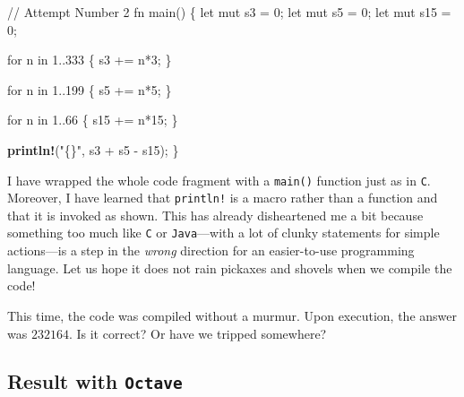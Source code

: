 \documentclass[
  a4paper,
]{article}
\newenvironment{Shaded}{\begin{snugshade}}{\end{snugshade}}
\newcommand{\CommentTok}[1]{\textcolor[rgb]{0.50,0.62,0.50}{#1}}
\newcommand{\ControlFlowTok}[1]{\textcolor[rgb]{0.94,0.87,0.69}{#1}}
\newcommand{\DecValTok}[1]{\textcolor[rgb]{0.86,0.86,0.80}{#1}}
\newcommand{\KeywordTok}[1]{\textcolor[rgb]{0.94,0.87,0.69}{#1}}
\newcommand{\NormalTok}[1]{\textcolor[rgb]{0.80,0.80,0.80}{#1}}
\newcommand{\OperatorTok}[1]{\textcolor[rgb]{0.94,0.94,0.82}{#1}}
\newcommand{\PreprocessorTok}[1]{\textcolor[rgb]{1.00,0.81,0.69}{\textbf{#1}}}
\newcommand{\StringTok}[1]{\textcolor[rgb]{0.80,0.58,0.58}{#1}}
\begin{document}
\begin{Shaded}
\begin{Highlighting}[]
 \CommentTok{// Attempt Number 2}
\KeywordTok{fn}\NormalTok{ main() }\OperatorTok{\{}
    \KeywordTok{let} \KeywordTok{mut}\NormalTok{ s3 }\OperatorTok{=} \DecValTok{0}\OperatorTok{;}
    \KeywordTok{let} \KeywordTok{mut}\NormalTok{ s5 }\OperatorTok{=} \DecValTok{0}\OperatorTok{;}
    \KeywordTok{let} \KeywordTok{mut}\NormalTok{ s15 }\OperatorTok{=} \DecValTok{0}\OperatorTok{;}

    \ControlFlowTok{for}\NormalTok{ n }\KeywordTok{in} \DecValTok{1}\OperatorTok{..}\DecValTok{333} \OperatorTok{\{}
\NormalTok{        s3 }\OperatorTok{+=}\NormalTok{ n}\OperatorTok{*}\DecValTok{3}\OperatorTok{;}
    \OperatorTok{\}}

    \ControlFlowTok{for}\NormalTok{ n }\KeywordTok{in} \DecValTok{1}\OperatorTok{..}\DecValTok{199} \OperatorTok{\{}
\NormalTok{        s5 }\OperatorTok{+=}\NormalTok{ n}\OperatorTok{*}\DecValTok{5}\OperatorTok{;}
    \OperatorTok{\}}

    \ControlFlowTok{for}\NormalTok{ n }\KeywordTok{in} \DecValTok{1}\OperatorTok{..}\DecValTok{66} \OperatorTok{\{}
\NormalTok{        s15 }\OperatorTok{+=}\NormalTok{ n}\OperatorTok{*}\DecValTok{15}\OperatorTok{;}
    \OperatorTok{\}}

    \PreprocessorTok{println!}\NormalTok{(}\StringTok{"\{\}"}\OperatorTok{,}\NormalTok{ s3 }\OperatorTok{+}\NormalTok{ s5 }\OperatorTok{{-}}\NormalTok{ s15)}\OperatorTok{;}
\OperatorTok{\}}
\end{Highlighting}
\end{Shaded}

I have wrapped the whole code fragment with a \texttt{main()} function
just as in \texttt{C}. Moreover, I have learned that \texttt{println!}
is a macro rather than a function and that it is invoked as shown. This
has already disheartened me a bit because something too much like
\texttt{C} or \texttt{Java}---with a lot of clunky statements for simple
actions---is a step in the \emph{wrong} direction for an easier-to-use
programming language. Let us hope it does not rain pickaxes and shovels
when we compile the code!

This time, the code was compiled without a murmur. Upon execution, the
answer was \(232164\). Is it correct? Or have we tripped somewhere?

\hypertarget{result-with-octave}{%
\subsection{\texorpdfstring{Result with
\texttt{Octave}}{Result with Octave}}\label{result-with-octave}}
\end{document}
